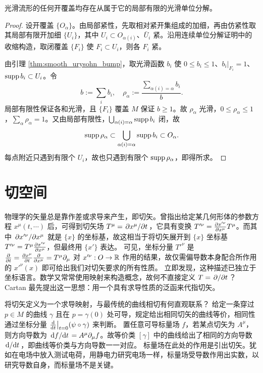 \begin{theorem}
    光滑流形的任何开覆盖均存在从属于它的局部有限的光滑单位分解。
\end{theorem}
\begin{proof}
    设开覆盖 $\{O_\alpha\}$。由局部紧性，先取相对紧开集组成的加细，再由仿紧性取其局部有限开加细 $\{U_i\}$，其中 $U_i\subset O_{\alpha(i)}$、$\bar U_i$ 紧。沿用连续单位分解证明中的收缩构造，取闭覆盖 $\{F_i\}$ 使 $F_i\subset U_i$，则各 $F_i$ 紧。

    由引理 \ref{thm:smooth_urysohn_bump}，取光滑函数 $b_i$ 使 $0\leqslant b_i\leqslant1$、$b_i|_{F_i}=1$、$\operatorname{supp} b_i\subset U_i$。令
    \[
        b:=\sum_i b_i,\quad
        \rho_\alpha:=\frac{\sum_{\alpha(i)=\alpha}b_i}{b}.
    \]
    局部有限性保证各和光滑，且 $\{F_i\}$ 覆盖 $M$ 保证 $b\geqslant1$。故 $\rho_\alpha$ 光滑，$0\leqslant\rho_\alpha\leqslant1$，$\sum_\alpha\rho_\alpha=1$。又由局部有限性，$\bigcup_{\alpha(i)=\alpha}\operatorname{supp} b_i$ 闭，故
    \[
        \operatorname{supp}\rho_\alpha\subset\bigcup_{\alpha(i)=\alpha}\operatorname{supp} b_i\subset O_\alpha.
    \]
    每点附近只遇到有限个 $U_i$，故也只遇到有限个 $\operatorname{supp}\rho_\alpha$，即得所求。
\end{proof}


\section{切空间}
\label{chdm:sec_tangent-bundles}


物理学的矢量总是靠作差或求导来产生，即切矢。曾指出给定某几何形体的参数方程 $x^\mu(t,\cdots)$ 后，可得到切矢场 $T^\mu = \pdv*{x^\mu}{t}$，它具有变换 $T'^\nu = \pdv{x'^\nu}{x^\mu}T^\mu$。而其中 $\pdv*{x'^\nu}{x^\mu}$ 就是 $\{x\}$ 的坐标基，故这相当于将切矢展开到 $\{x\}$ 坐标基 $T'^\nu = T^\mu \pdv{x'^\nu}{x^\mu}$，但最终用 $\{x'\}$ 表达。
可见，坐标分量 $T'^\nu$ 是 $\pdv{t}=\pdv{x^\mu}{t}\pdv{x^\mu}=T^\mu \partial_\mu$ 对 $x'^\nu:O\to\mathbb{R}$ 作用的结果，故仅需偏导数本身配合所作用的 $x'^\nu(x)$ 即可给出我们对切矢要求的所有性质。
立即发现，这种描述已独立于坐标语言。数学又常常使用映射来构造概念，故何不直接定义 $T=\pdv*{t}$？
Cartan 最先提出这一思想：用一个具有求导性质的泛函来代指切矢。

将切矢定义为一个求导映射，与最传统的曲线相切有何直观联系？
给定一条穿过 $p\in M$ 的曲线 $\gamma$ 且在 $p=\gamma(0)$ 处可导，规定给出相同切矢的曲线等价，相同性通过坐标分量 $\dv{t}\big|_{t=0}(\psi\circ\gamma)$ 来判断。
置任意可导标量场 $f$，若某点切矢为 $A^\mu$，则方向导数为 $\dv*{f}{t}=A^\mu\partial_\mu f$。故等价类 $[\gamma]$ 中的曲线给出了相同的方向导数 $\dv*{t}$，即曲线等价类与方向导数一一对应。
标量场在此处的作用是引出切矢。犹如在电场中放入测试电荷，用静电力研究电场一样，标量场受导数作用出实数，以研究导数自身，而标量场不是关键。

